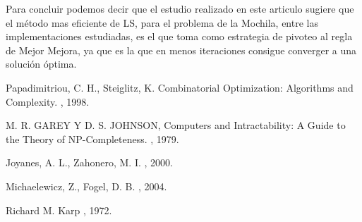 \documentclass{ci5652}
\begin{document}
	Para concluir podemos decir que el estudio realizado en este articulo sugiere que el método mas eficiente de LS, para el problema de la Mochila, entre las implementaciones estudiadas, es el que toma como estrategia de pivoteo al regla de Mejor Mejora, ya que es la que en menos iteraciones consigue converger a una solución óptima.


\small


\begin{thebibliography}{99}

Papadimitriou, C. H., Steiglitz, K. 
\newblock Combinatorial Optimization: Algorithms and Complexity. 
, 1998.


M. R. GAREY Y D. S. JOHNSON,
\newblock Computers and Intractability: A Guide to the Theory of NP-Completeness.
, 1979.

Joyanes, A. L., Zahonero, M. I. 
, 2000.

Michaelewicz, Z., Fogel, D. B. 
, 2004.

Richard M. Karp
, 1972.

\end{thebibliography}
\end{document}
